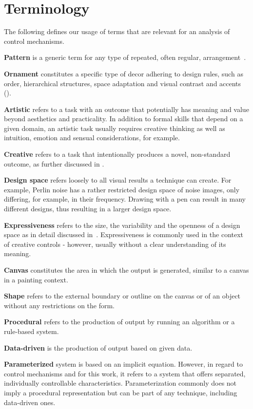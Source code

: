 
\section{Terminology}\label{terminology}
The following defines our usage of terms that are relevant for an analysis of control mechanisms. 

\textbf{Pattern} is a generic term for any type of repeated, often regular, arrangement~\cite{oed_2017}.


\textbf{Ornament} constitutes a specific type of decor adhering to design rules, such as order, hierarchical structures, space adaptation and visual contrast and accents ().

\textbf{Artistic} refers to a task with an outcome that potentially has meaning and value beyond aesthetics and practicality. In addition to formal skills that depend on a given domain, an artistic task usually requires creative thinking as well as intuition, emotion and sensual considerations, for example.

\textbf{Creative} refers to a task that intentionally produces a novel, non-standard outcome, as further discussed in . 

\textbf{Design space} refers loosely to all visual results a technique can create. For example, Perlin noise has a rather restricted design space of noise images, only differing, for example, in their frequency. Drawing with a pen can result in many different designs, thus resulting in a larger design space.

\textbf{Expressiveness} refers to the size, the variability and the openness of a design space as in detail discussed in~. Expressiveness is commonly used in the context of creative controls - however, usually without a clear understanding of its meaning.

\textbf{Canvas} constitutes the area in which the output is generated, similar to a canvas in a painting context.

\textbf{Shape} refers to the external boundary or outline on the canvas or of an object without any restrictions on the form. 

\textbf{Procedural} refers to the production of output by running an algorithm or a rule-based system.

\textbf{Data-driven} is the production of output based on given data.

\textbf{Parameterized} system is based on an implicit equation. However, in regard to control mechanisms and for this work, it refers to a system that offers separated, individually controllable characteristics. Parameterization commonly does not imply a procedural representation but can be part of any technique, including data-driven ones.